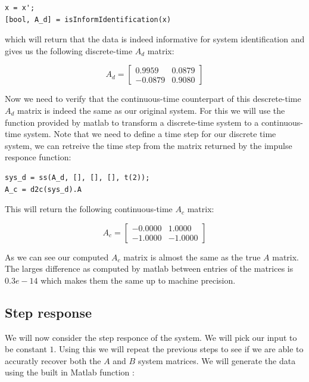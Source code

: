 \begin{lstlisting}
x = x';
[bool, A_d] = isInformIdentification(x)
\end{lstlisting}

which will return that the data is indeed informative for system identification and gives us the following discrete-time $A_d$ matrix:

\begin{equation*}
	A_d = \begin{bmatrix}
		 0.9959 &   0.0879 \\
		-0.0879 &   0.9080
	\end{bmatrix}
\end{equation*}

Now we need to verify that the continuous-time counterpart of this descrete-time $A_d$ matrix is indeed the same as our original system. For this we will use the function  provided by matlab to transform a discrete-time system to a continuous-time system. Note that we need to define a time step for our discrete time system, we can retreive the time step from the  matrix returned by the impulse responce function:

\begin{lstlisting}
sys_d = ss(A_d, [], [], [], t(2));
A_c = d2c(sys_d).A
\end{lstlisting}

This will return the following continuous-time $A_c$ matrix:

\begin{equation*}
	A_c = \begin{bmatrix}
		-0.0000 &   1.0000\\
		-1.0000 &  -1.0000
	\end{bmatrix}
\end{equation*}

As we can see our computed $A_c$ matrix is almost the same as the true $A$ matrix. The larges difference as computed by matlab between entries of the matrices is $0.3e-14$ which makes them the same up to machine precision.

\subsection{Step response}
We will now consider the step responce of the system. We will pick our input to be constant $1$. Using this we will repeat the previous steps to see if we are able to accuratly recover both the $A$ and $B$ system matrices. We will generate the data using the built in Matlab function : 

